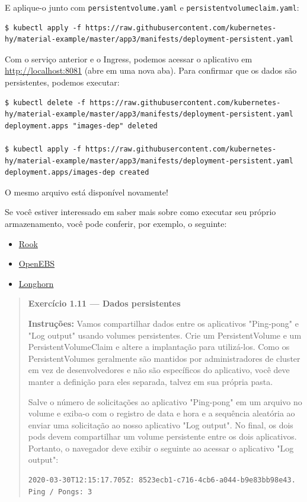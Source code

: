 \documentclass[11pt,a4paper]{article}
\begin{document}
E aplique-o junto com \texttt{persistentvolume.yaml} e \texttt{persistentvolumeclaim.yaml}:

\begin{verbatim}
$ kubectl apply -f https://raw.githubusercontent.com/kubernetes-hy/material-example/master/app3/manifests/deployment-persistent.yaml
\end{verbatim}

Com o serviço anterior e o Ingress, podemos acessar o aplicativo em \url{http://localhost:8081} (abre em uma nova aba). Para confirmar que os dados são persistentes, podemos executar:

\begin{verbatim}
$ kubectl delete -f https://raw.githubusercontent.com/kubernetes-hy/material-example/master/app3/manifests/deployment-persistent.yaml
deployment.apps "images-dep" deleted

$ kubectl apply -f https://raw.githubusercontent.com/kubernetes-hy/material-example/master/app3/manifests/deployment-persistent.yaml
deployment.apps/images-dep created
\end{verbatim}

O mesmo arquivo está disponível novamente!

Se você estiver interessado em saber mais sobre como executar seu próprio armazenamento, você pode conferir, por exemplo, o seguinte:

\begin{itemize}
    \item \href{https://rook.io/}{Rook}
    \item \href{https://openebs.io/}{OpenEBS}
    \item \href{https://longhorn.io/}{Longhorn}
\end{itemize}

\begin{quote}
\textbf{Exercício 1.11 --- Dados persistentes}

\textbf{Instruções:} Vamos compartilhar dados entre os aplicativos "Ping-pong" e "Log output" usando volumes persistentes. Crie um PersistentVolume e um PersistentVolumeClaim e altere a implantação para utilizá-los. Como os PersistentVolumes geralmente são mantidos por administradores de cluster em vez de desenvolvedores e não são específicos do aplicativo, você deve manter a definição para eles separada, talvez em sua própria pasta.

Salve o número de solicitações ao aplicativo "Ping-pong" em um arquivo no volume e exiba-o com o registro de data e hora e a sequência aleatória ao enviar uma solicitação ao nosso aplicativo "Log output". No final, os dois pods devem compartilhar um volume persistente entre os dois aplicativos. Portanto, o navegador deve exibir o seguinte ao acessar o aplicativo "Log output":

\begin{verbatim}
2020-03-30T12:15:17.705Z: 8523ecb1-c716-4cb6-a044-b9e83bb98e43.
Ping / Pongs: 3
\end{verbatim}
\end{quote}
\end{document}
